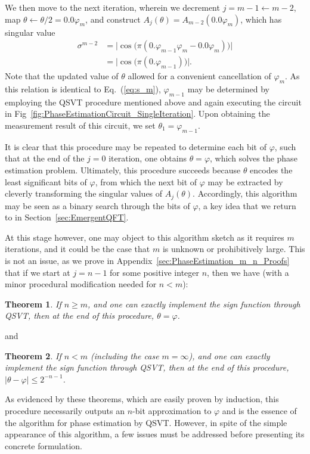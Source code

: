 \documentclass[aps,pra,showpacs,notitlepage,twocolumn,superscriptaddress,nofootinbib]{revtex4-1}
\newtheorem{theorem}{Theorem}
\begin{document}
    We then move to the next iteration, wherein we decrement $j=m-1 \leftarrow m-2$, map $\theta \leftarrow \theta /2 = 0.0\varphi_m$, and construct $A_j(\theta) = A_{m-2}(0.0\varphi_m)$, which has singular value
    \begin{equation}
    \begin{split}
        \sigma^{m-2} &= \big|\cos\big(\pi (0.\varphi_{m-1} \varphi_m - 0.0\varphi_m)\big) \big| \\
        &= \big|\cos\big(\pi (0.\varphi_{m-1})\big) \big|.
    \end{split}
    \end{equation}
    Note that the updated value of $\theta$ allowed for a convenient cancellation of $\varphi_m$. As this relation is identical to Eq.~(\ref{eq:s_m}), $\varphi_{m-1}$ may be determined by employing the QSVT procedure mentioned above and again executing the circuit in Fig~\ref{fig:PhaseEstimationCircuit_SingleIteration}. Upon obtaining the measurement result of this circuit, we set $\theta_1 = \varphi_{m-1}$. 
    
    It is clear that this procedure may be repeated to determine each bit of $\varphi$, such that at the end of the $j=0$ iteration, one obtains $\theta = \varphi$, which solves the phase estimation problem. Ultimately, this procedure succeeds because $\theta$ encodes the least significant bits of $\varphi$, from which the next bit of $\varphi$ may be extracted by cleverly transforming the singular values of $A_j(\theta)$. Accordingly, this algorithm may be seen as a binary search through the bits of $\varphi$, a key idea that we return to in Section~\ref{sec:EmergentQFT}.
    
    At this stage however, one may object to this algorithm sketch as it requires $m$ iterations, and it could be the case that $m$ is unknown or prohibitively large. This is not an issue, as we prove in Appendix~\ref{sec:PhaseEstimation_m_n_Proofs} that if we start at $j=n-1$ for some positive integer $n$, then we have (with a minor procedural modification needed for $n < m$):
    \begin{theorem} \label{thm:n_geq_m}
    If $n \geq m$, and one can exactly implement the sign function through QSVT, then at the end of this procedure, $\theta = \varphi$. 
    \end{theorem}
    and 
    \begin{theorem} \label{thm:n_l_m}
    If $n < m$ (including the case $m=\infty$),  and one can exactly implement the sign function through QSVT, then at the end of this procedure, $|\theta - \varphi| \leq 2^{-n-1}$. 
    \end{theorem}
    \noindent As evidenced by these theorems, which are easily proven by induction, this procedure necessarily outputs an $n$-bit approximation to $\varphi$ and is the essence of the algorithm for phase estimation by QSVT. However, in spite of the simple appearance of this algorithm, a few issues must be addressed before presenting its concrete formulation.
    
\end{document}
